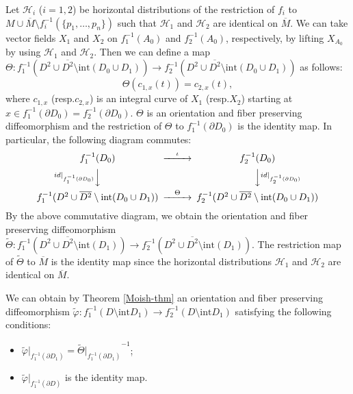 \documentclass{amsart}
\theoremstyle{plain}
\theoremstyle{definition}
\begin{document}
Let $\mathcal{H}_i$ ($i=1,2$) be horizontal distributions of the restriction of $f_i$ to $M\cup\overline{M}\setminus f_i^{-1}(\{p_1,\ldots,p_n\})$ 
such that $\mathcal{H}_1$ and $\mathcal{H}_2$ are identical on $\overline{M}$. 
We can take vector fields $X_1$ and $X_2$ on $f_1^{-1}(A_0)$ and $f_2^{-1}(A_0)$, respectively, by lifting $X_{A_0}$ by using $\mathcal{H}_1$ and $\mathcal{H}_2$. 
Then we can define a map $\Theta:f_1^{-1}(D^2\cup\overline{D^2}\setminus\text{int}(D_0\cup D_1))\rightarrow f_2^{-1}(D^2\cup\overline{D^2}\setminus\text{int}(D_0\cup D_1))$ as follows: 
\[
\Theta(c_{1,x}(t))=c_{2,x}(t), 
\]
\noindent
where $c_{1,x}$ (resp.$c_{2,x}$) is an integral curve of $X_1$ (resp.$X_2$) starting at $x\in f_1^{-1}(\partial D_0)=f_2^{-1}(\partial D_0)$. 
$\Theta$ is an orientation and fiber preserving diffeomorphism 
and the restriction of $\Theta$ to $f_1^{-1}(\partial D_0)$ is the identity map. 
In particular, the following diagram commutes: 
\[
\begin{CD}
f_1^{-1}(D_0) @>\iota>> f_2^{-1}(D_0) \\
@V id|_{f_1^{-1}(\partial D_0)} VV @VV id|_{f_2^{-1}(\partial D_0)} V \\
f_1^{-1}(D^2\cup \overline{D^2}\setminus\text{int}(D_0\cup D_1)) @>\Theta>> f_2^{-1}(D^2\cup \overline{D^2}\setminus\text{int}(D_0\cup D_1)) \\
\end{CD}
\]
By the above commutative diagram, we obtain the orientation and fiber preserving diffeomorphism $\tilde{\Theta}:f_1^{-1}(D^2\cup \overline{D^2}\setminus\text{int}(D_1))\rightarrow f_2^{-1}(D^2\cup \overline{D^2}\setminus\text{int}(D_1))$. 
The restriction map of $\tilde{\Theta}$ to $\overline{M}$ is the identity map since the horizontal distributions $\mathcal{H}_1$ and $\mathcal{H}_2$ are identical on $\overline{M}$. 

\par

We can obtain by Theorem \ref{Moish-thm} an orientation and fiber preserving diffeomorphism $\tilde{\varphi}:f_1^{-1}(D\setminus\text{int}D_1)\rightarrow f_2^{-1}(D\setminus\text{int}D_1)$ satisfying the following conditions: 

\begin{itemize}

\item $\tilde{\varphi}|_{f_1^{-1}(\partial D_1)}={\tilde{\Theta}|_{f_1^{-1}(\partial D_1)}}^{-1}$; 

\item $\tilde{\varphi}|_{f_1^{-1}(\partial D)}$ is the identity map. 

\end{itemize}
\end{document}
